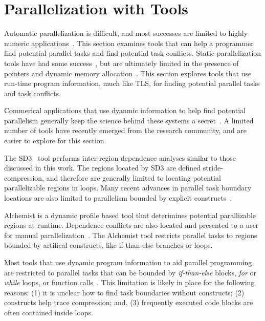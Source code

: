 \documentclass[defaultstyle,11pt]{thesis}
\begin{document}
\section{Parallelization with Tools}
\label{sec:paralleltools}

Automatic parallelization is difficult, and most successes are limited
to highly numeric
applications~\cite{larus:1993:pads,ramaseshan:08:nc}.  This section
examines tools that can help a programmer find potential parallel
tasks and find potential task conflicts.  Static parallelization tools
have had some success~\cite{kennedy:91:pads}, but are ultimately
limited in the presence of pointers and dynamic memory
allocation~\cite{minjang:10:micro}. This section explores tools that
use run-time program information, much like TLS, for finding potential
parallel tasks and task conflicts.

Commerical applications that use dyanmic information to help find
potential parallelism generally keep the science behind these systems
a secret~\cite{cogswell:2010:eweek, vectorfabrics:11:ws}.  A limited
number of tools have recently emerged from the research community, and
are easier to explore for this section.

The SD3~\cite{minjang:10:micro} tool performs inter-region dependence
analyses similar to those discussed in this work.  The regions located
by SD3 are defined stride-compression, and therefore are generally
limited to locating potential parallelizable regions in loops.  Many
recent advances in parallel task boundary locations are also limited to
parallelism bounded by explicit constructs~\cite{jeon:2011:hotpar,
  garcia:2011:pldi}.

Alchemist is a dynamic profile based tool that deterimines potential
parallizable regions at runtime.  Dependence conflicts are also
located and presented to a user for manual
parallelization~\cite{zhang:09:cgo}.  The Alchemist tool restricts
parallel tasks to regions bounded by artifical constructs, like
if-than-else branches or loops.

Most tools that use dynamic program information to aid parallel
programming are restricted to parallel tasks that can be bounded by
\textit{if-than-else} blocks, \textit{for} or \textit{while} loops, or
function calls~\cite{zhang:09:cgo, minjang:10:micro, jeon:2011:hotpar,
  garcia:2011:pldi}.  This limitation is likely in place for the
following reasons: (1) it is unclear how to find task boundaries
without constructs; (2) constructs help trace compression; and, (3)
frequently executed code blocks are often contained inside loops.
\end{document}
